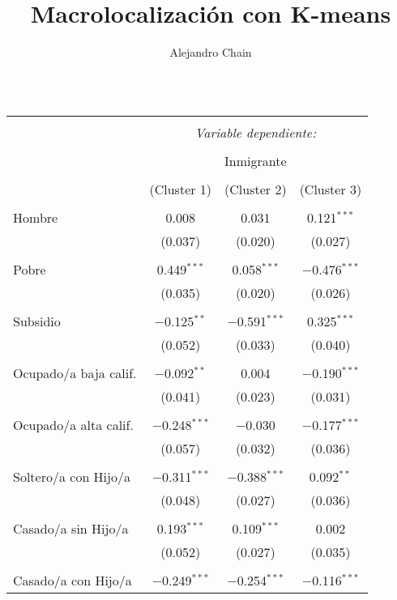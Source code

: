 \documentclass[10pt,a4paper]{book}
\author{Alejandro Chain}
\title{Macrolocalización con K-means}
\begin{document}
\maketitle
\begin{table}[!htbp] \centering 
  \caption{} 
  \label{} 
\small 
\begin{tabular}{@{\extracolsep{5pt}}lccc} 
\\[-1.8ex]\hline 
\hline \\[-1.8ex] 
 & \multicolumn{3}{c}{\textit{Variable dependiente:}} \\ 
\cline{2-4} 
\\[-1.8ex] & \multicolumn{3}{c}{Inmigrante} \\ 
\\[-1.8ex] & (Cluster 1) & (Cluster 2) & (Cluster 3)\\ 
\hline \\[-1.8ex] 
 Hombre & 0.008 & 0.031 & 0.121$^{***}$ \\ 
  & (0.037) & (0.020) & (0.027) \\ 
  & & & \\ 
 Pobre & 0.449$^{***}$ & 0.058$^{***}$ & $-$0.476$^{***}$ \\ 
  & (0.035) & (0.020) & (0.026) \\ 
  & & & \\ 
 Subsidio & $-$0.125$^{**}$ & $-$0.591$^{***}$ & 0.325$^{***}$ \\ 
  & (0.052) & (0.033) & (0.040) \\ 
  & & & \\ 
 Ocupado/a baja calif. & $-$0.092$^{**}$ & 0.004 & $-$0.190$^{***}$ \\ 
  & (0.041) & (0.023) & (0.031) \\ 
  & & & \\ 
 Ocupado/a alta calif. & $-$0.248$^{***}$ & $-$0.030 & $-$0.177$^{***}$ \\ 
  & (0.057) & (0.032) & (0.036) \\ 
  & & & \\ 
 Soltero/a con Hijo/a & $-$0.311$^{***}$ & $-$0.388$^{***}$ & 0.092$^{**}$ \\ 
  & (0.048) & (0.027) & (0.036) \\ 
  & & & \\ 
 Casado/a sin Hijo/a & 0.193$^{***}$ & 0.109$^{***}$ & 0.002 \\ 
  & (0.052) & (0.027) & (0.035) \\ 
  & & & \\ 
 Casado/a con Hijo/a & $-$0.249$^{***}$ & $-$0.254$^{***}$ & $-$0.116$^{***}$ \\ 

\end{tabular}
\end{table}
\end{document}
